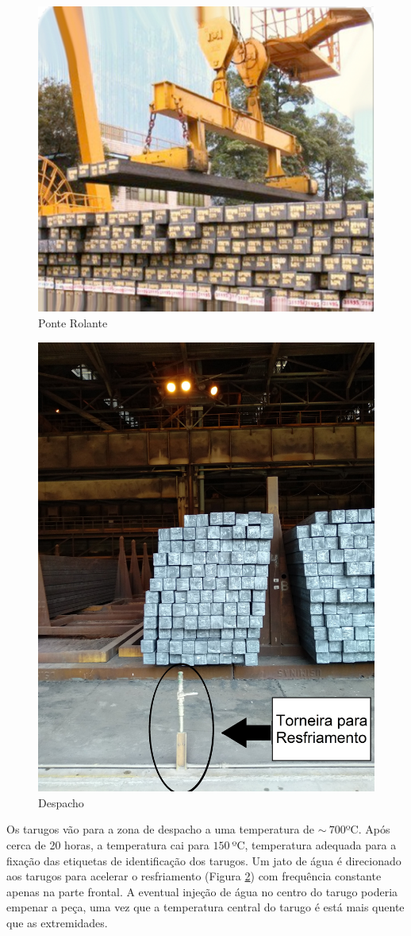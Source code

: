\begin{figure}[htbp]
	\centering
	\includegraphics[width=0.7\linewidth]{figuras/Steel/ponte_rolante.png}
	\caption{Ponte Rolante}
	\label{fig:crane}
\end{figure}

\begin{figure}[htbp]
	\centering
	\includegraphics[width=0.5\linewidth]{figuras/Steel/despacho.jpg}
	\caption{Despacho}
	\label{fig:despacho}
\end{figure}

Os tarugos vão para a zona de despacho a uma temperatura de $\sim~700$ºC.
%
Após cerca de 20 horas, a temperatura cai para $150~$ºC, temperatura adequada para a fixação das etiquetas de identificação dos tarugos.
%
Um jato de água é direcionado aos tarugos para acelerar o resfriamento (Figura \ref{fig:despacho}) com frequência constante apenas na parte frontal.
%
A eventual injeção de água no centro do tarugo poderia empenar a peça, uma vez que a temperatura central do tarugo é está mais quente que as extremidades.


